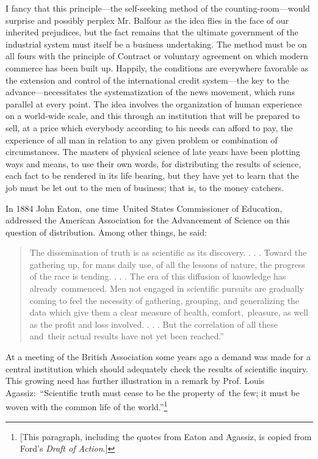 \documentclass[twoside,symmetric,nobib,justified]{tufte-book}
\begin{document}
\newpage I fancy that this principle---the self-seeking method of the
counting-room---would surprise and possibly perplex Mr. Balfour as the
idea flies in the face of our inherited prejudices, but the fact remains
that the ultimate government of the industrial system must itself be a
business undertaking. The method must be on all fours with the principle
of Contract or voluntary agreement on which modern commerce has been
built up. Happily, the conditions are everywhere favorable as the
extension and control of the international credit system---the key to
the advance---necessitates the systematization of the news movement,
which runs parallel at every point. The idea involves the organization
of human experience on a world-wide scale, and this through an
institution that will be prepared to sell, at a price which everybody
according to his needs can afford to pay, the experience of all man in
relation to any given problem or combination of circumstances. The
masters of physical science of late years have been plotting ways and
means, to use their own words, for distributing the results of science,
each fact to be rendered in its life bearing, but they have yet to learn
that the job must be let out to the men of business; that is, to the
money catchers.~

In 1884 John Eaton,~one time~United States Commissioner of Education,
addressed the American Association for the Advancement of Science on
this question of distribution. Among other things, he said:~

\begin{quote}
The dissemination of truth is as scientific as its discovery. . . .
Toward the gathering up, for man\textquotesingle s daily use, of all the
lessons of nature, the progress of the race is tending. . . . The era of
this diffusion of knowledge has already~commenced. Men not engaged in
scientific pursuits are gradually coming to feel the necessity of
gathering, grouping, and generalizing the data which give them a clear
measure of health, comfort,~pleasure, as well as the profit and loss
involved. . . . But the correlation of all these and~their actual
results have not yet been reached.''~
\end{quote}

\noindent At a meeting of the British Association some years ago a demand was made
for a central institution which should adequately check the results of
scientific inquiry. This growing need has further illustration in a
remark by Prof. Louis Agassiz:~``Scientific truth must cease to be the
property of~the few; it must be woven with the common life of the
world.''\footnote{{[}This paragraph, including the quotes from Eaton and
  Agassiz, is copied from Ford's \emph{Draft of Action}.{]}}~
\end{document}
